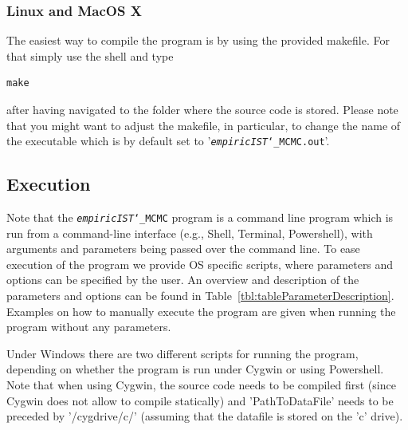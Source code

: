 \documentclass[12pt,a4paper]{scrartcl}
\begin{document}
\subsubsection*{Linux and MacOS X}

The easiest way to compile the program is by using the provided makefile. For that simply use the shell and type
\begin{lstlisting}
make
\end{lstlisting}
after having navigated to the folder where the source code is stored.
Please note that you might want to adjust the makefile, in particular, to change the name of the executable which is by default set to '\texttt{\emph{empiricIST}\char`_MCMC.out}'.

\subsection{Execution}
 
Note that the \texttt{\emph{empiricIST}\char`_MCMC} program is a command line program which is run from a command-line interface (e.g., Shell, Terminal, Powershell), with arguments and parameters being passed over the command line. To ease execution of the program we provide OS specific scripts, where parameters and options can be specified by the user. An overview and description of the parameters and options can be found in Table~\ref{tbl:tableParameterDescription}. Examples on how to manually execute the program are given when running the program without any parameters.
 
Under Windows there are two different scripts for running the program, depending on whether the program is run under Cygwin or using Powershell. Note that when using Cygwin, the source code needs to be compiled first (since Cygwin does not allow to compile statically) and 'PathToDataFile' needs to be preceded by '/cygdrive/c/' (assuming that the datafile is stored on the 'c' drive).
\end{document}
